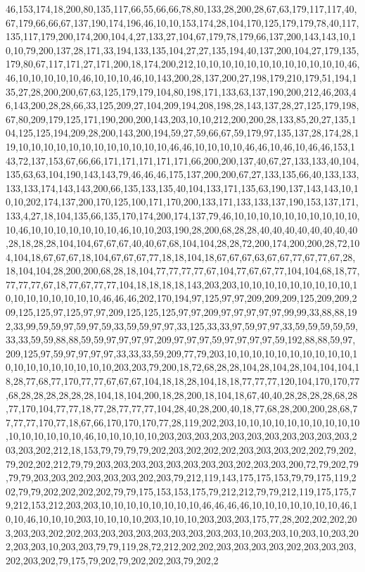 46,153,174,18,200,80,135,117,66,55,66,66,78,80,133,28,200,28,67,63,179,117,117,40,67,179,66,66,67,137,190,174,196,46,10,10,153,174,28,104,170,125,179,179,78,40,117,135,117,179,200,174,200,104,4,27,133,27,104,67,179,78,179,66,137,200,143,143,10,10,10,79,200,137,28,171,33,194,133,135,104,27,27,135,194,40,137,200,104,27,179,135,179,80,67,117,171,27,171,200,18,174,200,212,10,10,10,10,10,10,10,10,10,10,10,10,46,46,10,10,10,10,10,46,10,10,10,46,10,143,200,28,137,200,27,198,179,210,179,51,194,135,27,28,200,200,67,63,125,179,179,104,80,198,171,133,63,137,190,200,212,46,203,46,143,200,28,28,66,33,125,209,27,104,209,194,208,198,28,143,137,28,27,125,179,198,67,80,209,179,125,171,190,200,200,143,203,10,10,212,200,200,28,133,85,20,27,135,104,125,125,194,209,28,200,143,200,194,59,27,59,66,67,59,179,97,135,137,28,174,28,119,10,10,10,10,10,10,10,10,10,10,10,10,46,46,10,10,10,10,46,46,10,46,10,46,46,153,143,72,137,153,67,66,66,171,171,171,171,171,66,200,200,137,40,67,27,133,133,40,104,135,63,63,104,190,143,143,79,46,46,46,175,137,200,200,67,27,133,135,66,40,133,133,133,133,174,143,143,200,66,135,133,135,40,104,133,171,135,63,190,137,143,143,10,10,10,202,174,137,200,170,125,100,171,170,200,133,171,133,133,137,190,153,137,171,133,4,27,18,104,135,66,135,170,174,200,174,137,79,46,10,10,10,10,10,10,10,10,10,10,10,46,10,10,10,10,10,10,10,46,10,10,203,190,28,200,68,28,28,40,40,40,40,40,40,40,40,28,18,28,28,104,104,67,67,67,40,40,67,68,104,104,28,28,72,200,174,200,200,28,72,104,104,18,67,67,67,18,104,67,67,67,77,18,18,104,18,67,67,67,63,67,67,77,67,77,67,28,18,104,104,28,200,200,68,28,18,104,77,77,77,77,67,104,77,67,67,77,104,104,68,18,77,77,77,77,67,18,77,67,77,77,104,18,18,18,18,143,203,203,10,10,10,10,10,10,10,10,10,10,10,10,10,10,10,10,10,46,46,46,202,170,194,97,125,97,97,209,209,209,125,209,209,209,125,125,97,125,97,97,209,125,125,125,97,97,209,97,97,97,97,97,99,99,33,88,88,192,33,99,59,59,97,59,97,59,33,59,59,97,97,33,125,33,33,97,59,97,97,33,59,59,59,59,59,33,33,59,59,88,88,59,59,97,97,97,97,209,97,97,97,59,97,97,97,97,59,192,88,88,59,97,209,125,97,59,97,97,97,97,33,33,33,59,209,77,79,203,10,10,10,10,10,10,10,10,10,10,10,10,10,10,10,10,10,10,10,203,203,79,200,18,72,68,28,28,104,28,104,28,104,104,104,18,28,77,68,77,170,77,77,67,67,67,104,18,18,28,104,18,18,77,77,77,120,104,170,170,77,68,28,28,28,28,28,28,104,18,104,200,18,28,200,18,104,18,67,40,40,28,28,28,28,68,28,77,170,104,77,77,18,77,28,77,77,77,104,28,40,28,200,40,18,77,68,28,200,200,28,68,77,77,77,170,77,18,67,66,170,170,170,77,28,119,202,203,10,10,10,10,10,10,10,10,10,10,10,10,10,10,10,10,46,10,10,10,10,10,203,203,203,203,203,203,203,203,203,203,203,203,203,202,212,18,153,79,79,79,79,202,203,202,202,202,203,203,203,202,202,79,202,79,202,202,212,79,79,203,203,203,203,203,203,203,203,202,203,203,200,72,79,202,79,79,79,203,203,202,203,203,203,202,203,79,212,119,143,175,175,153,79,79,175,119,202,79,79,202,202,202,202,79,79,175,153,153,175,79,212,212,79,79,212,119,175,175,79,212,153,212,203,203,10,10,10,10,10,10,10,10,46,46,46,46,10,10,10,10,10,10,10,46,10,10,46,10,10,10,203,10,10,10,10,203,10,10,10,203,203,203,175,77,28,202,202,202,203,203,203,202,202,203,203,203,203,203,203,203,203,203,10,203,203,10,203,10,203,202,203,203,10,203,203,79,79,119,28,72,212,202,202,203,203,203,203,202,203,203,203,202,203,202,79,175,79,202,79,202,202,203,79,202,2